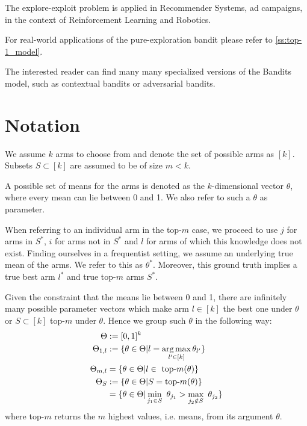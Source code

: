 The explore-exploit problem is applied in Recommender Systems, ad campaigns, in
the context of Reinforcement Learning and Robotics.

For real-world applications of the pure-exploration bandit please refer to
\ref{ss:top-1_model}.

The interested reader can find many many specialized versions of the Bandits
model, such as contextual bandits or adversarial bandits.

\section{Notation}\label{section:notation}
We assume $k$ arms to choose from and denote the set of possible arms as $[k]$.
Subsets $S \subset [k]$ are assumed to be of size $m < k$.

A possible set of means for the arms is denoted as the $k$-dimensional vector
$\theta$, where every mean can lie between 0 and 1. We also refer to such a
$\theta$ as parameter.

When referring to an individual arm in the top-$m$ case, we proceed to use $j$
for arms in $S^*$, $i$ for arms not in $S^*$ and $l$ for arms of which this
knowledge does not exist. Finding ourselves in a frequentist setting, we assume
an underlying true mean of the arms. We refer to this as $\theta^*$. Moreover,
this ground truth implies a true best arm $l^*$ and true top-$m$ arms $S^*$.

Given the constraint that the means lie between 0 and 1, there are infinitely
many possible parameter vectors which make arm $l \in [k]$ the best one under
$\theta$ or $S \subset [k]$ top-$m$ under $\theta$. Hence we group such $\theta$
in the following way:
\begin{align}
  \Theta &:= [0, 1]^k \\
  \Theta_{1, l} &:= \{\theta \in \Theta | l = \operatorname*{arg\,max}_{l' \in [k]}
      \theta_{l'}\} \\
  \Theta_{m, l} &= \{\theta \in \Theta | l \in \text{ top-}m(\theta)\} \\
  \Theta_S &:= \{\theta \in \Theta | S = \text{top-}m(\theta)\} \\
    &= \{ \theta \in \Theta| \min_{j_1 \in S}\ \theta_{j_1} > \max_{j_2 \notin
      S}\ \theta_{j_2}\}
\end{align}
where top-$m$ returns the $m$ highest values, i.e. means, from its argument
$\theta$.

